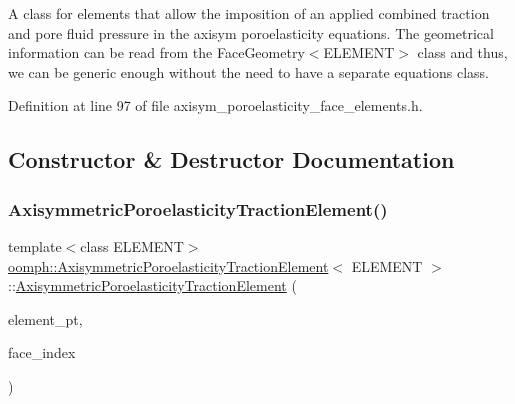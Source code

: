A class for elements that allow the imposition of an applied combined traction and pore fluid pressure in the axisym poroelasticity equations. The geometrical information can be read from the Face\+Geometry$<$\+E\+L\+E\+M\+E\+N\+T$>$ class and thus, we can be generic enough without the need to have a separate equations class. 

Definition at line 97 of file axisym\+\_\+poroelasticity\+\_\+face\+\_\+elements.\+h.



\subsection{Constructor \& Destructor Documentation}
\mbox{\label{classoomph_1_1AxisymmetricPoroelasticityTractionElement_aa640d489135a4daeb423a4f5ff3cf444}} 
\subsubsection{\texorpdfstring{Axisymmetric\+Poroelasticity\+Traction\+Element()}{AxisymmetricPoroelasticityTractionElement()}\hspace{0.1cm}{\footnotesize\ttfamily [1/2]}}
{\footnotesize\ttfamily template$<$class E\+L\+E\+M\+E\+NT$>$ \\
\hyperlink{classoomph_1_1AxisymmetricPoroelasticityTractionElement}{oomph\+::\+Axisymmetric\+Poroelasticity\+Traction\+Element}$<$ E\+L\+E\+M\+E\+NT $>$\+::\hyperlink{classoomph_1_1AxisymmetricPoroelasticityTractionElement}{Axisymmetric\+Poroelasticity\+Traction\+Element} (\begin{DoxyParamCaption}\item[{\hyperlink{classoomph_1_1FiniteElement}{Finite\+Element} $\ast$const \&}]{element\+\_\+pt,  }\item[{const int \&}]{face\+\_\+index }\end{DoxyParamCaption})\hspace{0.3cm}{\ttfamily [inline]}}



